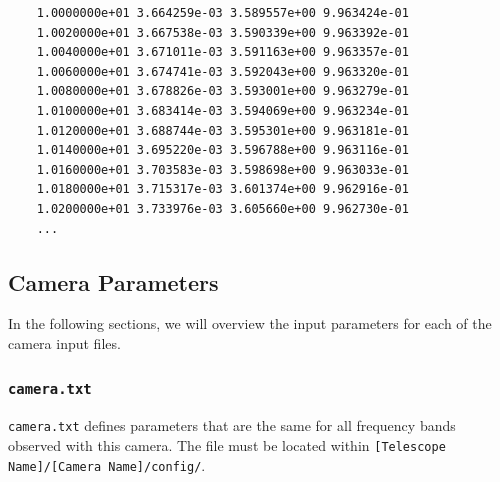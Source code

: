 \documentclass[11pt]{article} %
\begin{document}
\begin{lstlisting}
	1.0000000e+01 3.664259e-03 3.589557e+00 9.963424e-01
	1.0020000e+01 3.667538e-03 3.590339e+00 9.963392e-01
	1.0040000e+01 3.671011e-03 3.591163e+00 9.963357e-01
	1.0060000e+01 3.674741e-03 3.592043e+00 9.963320e-01
	1.0080000e+01 3.678826e-03 3.593001e+00 9.963279e-01
	1.0100000e+01 3.683414e-03 3.594069e+00 9.963234e-01
	1.0120000e+01 3.688744e-03 3.595301e+00 9.963181e-01
	1.0140000e+01 3.695220e-03 3.596788e+00 9.963116e-01
	1.0160000e+01 3.703583e-03 3.598698e+00 9.963033e-01
	1.0180000e+01 3.715317e-03 3.601374e+00 9.962916e-01
	1.0200000e+01 3.733976e-03 3.605660e+00 9.962730e-01
	...
\end{lstlisting}


\subsection{Camera Parameters}

In the following sections, we will overview the input parameters for each of the camera input files.


\subsubsection{\texttt{camera.txt}}

\texttt{camera.txt} defines parameters that are the same for all frequency bands observed with this camera. The file must be located within \texttt{[Telescope Name]/[Camera Name]/config/}.
\end{document}
